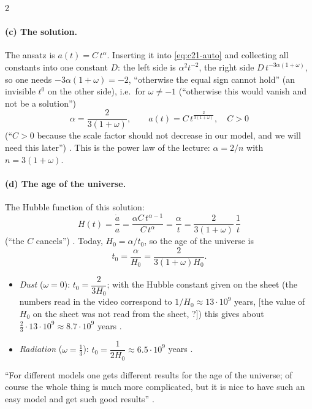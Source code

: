 \begin{paracol}{2}
\paragraph{(c) The solution.} The ansatz is $a(t)=C\,t^{\alpha}$. Inserting it into \eqref{eq:c21-auto} and collecting all constants into one constant $D$: the left side is $\alpha^2t^{-2}$, the right side $D\,t^{-3\alpha(1+\omega)}$, so one needs $-3\alpha(1+\omega)=-2$, ``otherwise the equal sign cannot hold'' (an invisible $t^0$ on the other side), i.e.\ for $\omega\neq-1$ (``otherwise this would vanish and not be a solution'')
\[
  \alpha=\frac{2}{3(1+\omega)},\qquad a(t)=C\,t^{\frac{2}{3(1+\omega)}},\quad C>0
\]
(``$C>0$ because the scale factor should not decrease in our model, and we will need this later'') . This is the power law of the lecture: $\alpha=2/n$ with $n=3(1+\omega)$.

\paragraph{(d) The age of the universe.} The Hubble function of this solution:
\[
  H(t)=\frac{\dot a}a=\frac{\alpha C\,t^{\alpha-1}}{C\,t^{\alpha}}=\frac{\alpha}{t}=\frac{2}{3(1+\omega)}\,\frac1t
\]
(``the $C$ cancels'') . Today, $H_0=\alpha/t_0$, so the age of the universe is
\[
  t_0=\frac{\alpha}{H_0}=\frac{2}{3(1+\omega)H_0}.
\]
\begin{itemize}
  \item \emph{Dust} ($\omega=0$): $t_0=\dfrac{2}{3H_0}$; with the Hubble constant given on the sheet (the numbers read in the video correspond to $1/H_0\approx13\cdot10^9$ years, [the value of $H_0$ on the sheet was not read from the sheet, ?]) this gives about $\tfrac23\cdot13\cdot10^9\approx8.7\cdot10^9$ years .
  \item \emph{Radiation} ($\omega=\tfrac13$): $t_0=\dfrac{1}{2H_0}\approx6.5\cdot10^9$ years .
\end{itemize}
``For different models one gets different results for the age of the universe; of course the whole thing is much more complicated, but it is nice to have such an easy model and get such good results'' .


\end{paracol}
